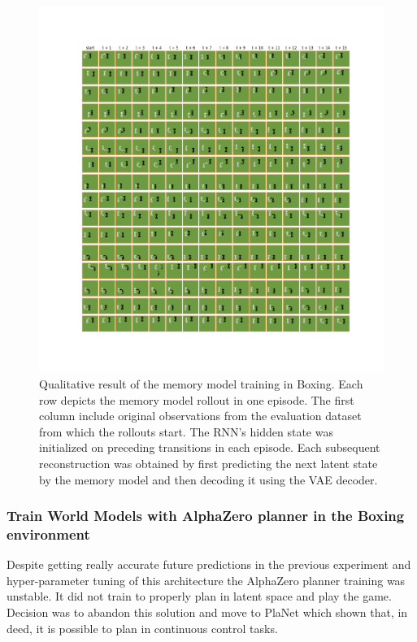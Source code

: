 \begin{figure}[H]
\includegraphics[width=1\textwidth,keepaspectratio]{figures/Boxing_memory.png}
\caption[Qualitative result of the World Models memory model training in Boxing]{Qualitative result of the memory model training in Boxing. Each row depicts the memory model rollout in one episode. The first column include original observations from the evaluation dataset from which the rollouts start. The RNN's hidden state was initialized on preceding transitions in each episode. Each subsequent reconstruction was obtained by first predicting the next latent state by the memory model and then decoding it using the VAE decoder.}
\label{Fig.WM_Boxing_memory}
\end{figure}

\subsubsection{Train World Models with AlphaZero planner in the Boxing environment}

Despite getting really accurate future predictions in the previous experiment and hyper-parameter tuning of this architecture the AlphaZero planner training was unstable. It did not train to properly plan in latent space and play the game. Decision was to abandon this solution and move to PlaNet which shown that, in deed, it is possible to plan in continuous control tasks.

